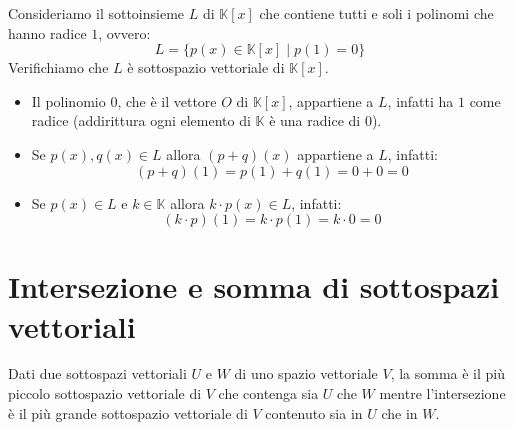 \begin{example}
	Consideriamo il sottoinsieme $L$ di $\mathbb{K}[x]$ che contiene tutti
	e soli i polinomi che hanno radice $1$, ovvero:
	\begin{equation*}
		L = \{p(x) \in \mathbb{K}[x] \mid p(1) = 0\}
	\end{equation*}
	Verifichiamo che $L$ \`e sottospazio vettoriale di $\mathbb{K}[x]$.
	\begin{itemize}
		\item
		      Il polinomio $0$, che \`e il vettore $O$ di $\mathbb{K}[x]$,
		      appartiene a $L$, infatti ha $1$ come radice (addirittura ogni
		      elemento di $\mathbb{K}$ \`e una radice di $0$).
		\item
		      Se $p(x), q(x) \in L$ allora $(p + q)(x)$ appartiene a $L$,
		      infatti:
		      \begin{equation*}
			      (p + q)(1) = p(1) + q(1) = 0 + 0 = 0
		      \end{equation*}
		\item
		      Se $p(x) \in L$ e $k \in \mathbb{K}$ allora $k \cdot p(x) \in L$,
		      infatti:
		      \begin{equation*}
			      (k \cdot p)(1) = k \cdot p(1) = k \cdot 0 = 0
		      \end{equation*}
	\end{itemize}
\end{example}

\section{Intersezione e somma di sottospazi vettoriali}
Dati due sottospazi vettoriali $U$ e $W$ di uno spazio vettoriale $V$,
la somma \`e il pi\`u piccolo sottospazio vettoriale di $V$
che contenga sia $U$ che $W$ mentre l'intersezione \`e il pi\`u
grande sottospazio vettoriale di $V$ contenuto sia in $U$ che in $W$.

